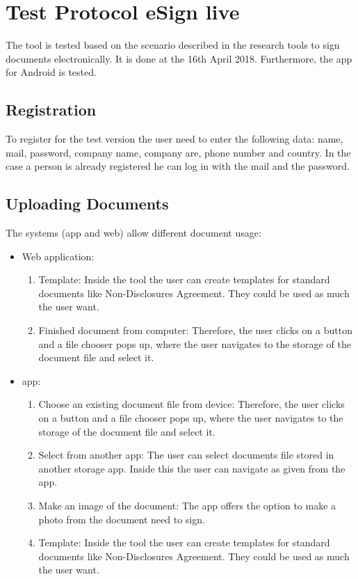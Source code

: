 \section{Test Protocol eSign live}
\label{tool:sec:esign}
The tool is tested based on the scenario described in the research tools to sign documents electronically. It is done at the 16th April 2018. Furthermore, the \gls{app} for Android is tested.

\subsection{Registration}
To register for  the test version the user need to enter the following data: name, mail, password, company name, company are, phone number and country. In the case a person is already registered he can log in with the mail and the password.

\subsection{Uploading Documents}
The systems (\gls{app} and web) allow different document usage:
\begin{itemize}
	\item Web application:
	\begin{enumerate}
		\item Template: Inside the tool the user can create templates for standard documents like Non-Disclosures Agreement. They could be used as much the user want.
		\item Finished document from computer: Therefore, the user clicks on a button and a file chooser pops up, where the user navigates to the storage of the document file and select it.
	\end{enumerate}
	\item \Gls{app}:
	\begin{enumerate}
		\item Choose an existing document file from device: Therefore, the user clicks on a button and a file chooser pops up, where the user navigates to the storage of the document file and select it.
		\item Select from another \gls{app}: The user can select documents file stored in another storage \gls{app}. Inside this the user can navigate as given from the \gls{app}.
		\item Make an image of the document: The \gls{app} offers the option to make a photo from the document need to sign.
		\item Template: Inside the tool the user can create templates for standard documents like Non-Disclosures Agreement. They could be used as much the user want.
	\end{enumerate}
\end{itemize}

